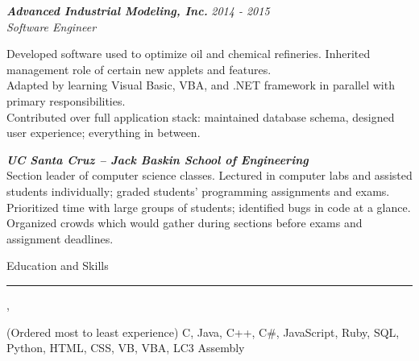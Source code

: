 \documentclass[10pt]{article}
\newcommand{\simsbullet}{{\raisebox{2pt}{\tiny $\bullet$}}\hspace{8pt}}
\begin{document}
\setlength{\leftskip}{0pt}

\vskip 8pt

{\bfseries\itshape\sffamily Advanced Industrial Modeling, Inc.} \hfill \textsf{\textit{2014 - 2015}} \\
\textit{\textsf{Software Engineer}}
\vskip 4pt

\setlength{\leftskip}{16pt}

Developed software used to optimize oil and chemical refineries.
\vskip 4pt
\simsbullet Inherited management role of certain new applets and features.  \\
\simsbullet Adapted by learning Visual Basic, VBA, and .NET framework in parallel with primary responsibilities. \\
\simsbullet Contributed over full application stack: maintained database schema, designed user experience; everything in between.  

\setlength{\leftskip}{0pt}

\vskip 8pt

{\bfseries\itshape\sffamily UC Santa Cruz -- Jack Baskin School of Engineering} \hfill {\itshape{}} \\
{\itshape{}}
\vskip 4pt
\setlength{\leftskip}{16pt}
Section leader of computer science classes. Lectured in computer labs and assisted students individually; graded students' programming assignments and exams. 
\vskip 4pt
\simsbullet Prioritized time with large groups of students; identified bugs in code at a glance.\\
\simsbullet Organized crowds which would gather during sections before exams and assignment deadlines. 

\setlength{\leftskip}{0pt}


\vskip 12pt

{\Large Education and Skills}
\vskip 4pt
\hrule
\vskip 6pt
{}
\vskip 2pt
\hspace*{12pt} {\itshape{}}, {} \\
\hspace*{12pt} {\itshape{}}


\vskip 6pt
{ (Ordered most to least experience)}
\vskip 2pt
\hspace*{12pt} {\sffamily C, Java, C++, C\#, JavaScript, Ruby, SQL, Python, HTML, CSS, VB, VBA, LC3 Assembly}
\end{document}
